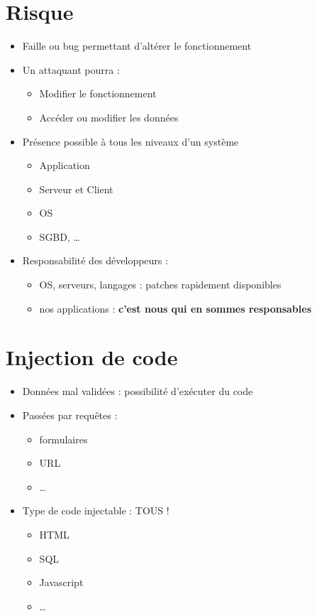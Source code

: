 \hypertarget{risque}{%
\section{Risque}\label{risque}}

\begin{itemize}
\tightlist
\item
  Faille ou bug permettant d'altérer le fonctionnement
\item
  Un attaquant pourra :

  \begin{itemize}
  \tightlist
  \item
    Modifier le fonctionnement
  \item
    Accéder ou modifier les données
  \end{itemize}
\item
  Présence possible à tous les niveaux d'un système

  \begin{itemize}
  \tightlist
  \item
    Application
  \item
    Serveur et Client
  \item
    OS
  \item
    SGBD, \ldots{}
  \end{itemize}
\item
  Responsabilité des développeurs :

  \begin{itemize}
  \tightlist
  \item
    OS, serveurs, langages : patches rapidement disponibles
  \item
    nos applications : \textbf{c'est nous qui en sommes responsables}
  \end{itemize}
\end{itemize}

\hypertarget{injection-de-code}{%
\section{Injection de code}\label{injection-de-code}}

\begin{itemize}
\tightlist
\item
  Données mal validées : possibilité d'exécuter du code
\item
  Passées par requêtes :

  \begin{itemize}
  \tightlist
  \item
    formulaires
  \item
    URL
  \item
    \ldots{}
  \end{itemize}
\item
  Type de code injectable : TOUS !

  \begin{itemize}
  \tightlist
  \item
    HTML
  \item
    SQL
  \item
    Javascript
  \item
    \ldots{}
  \end{itemize}
\end{itemize}

